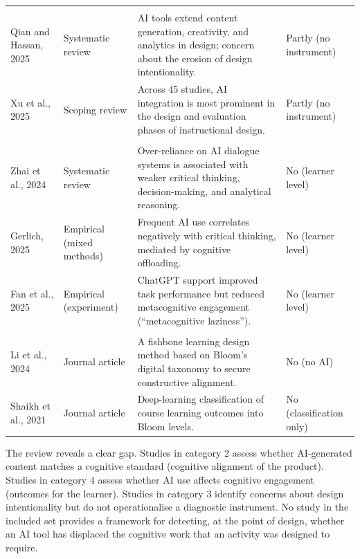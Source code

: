 \documentclass[journal,article,submit,pdftex,moreauthors]{Definitions/mdpi}
\begin{document}
\begin{table}[H]
\begin{tabularx}{\linewidth}{>{\raggedright\arraybackslash}p{2.5cm}>{\raggedright\arraybackslash}p{1.7cm}>{\raggedright\arraybackslash}X>{\raggedright\arraybackslash}p{1.7cm}}
\midrule
\multicolumn{4}{l}{\textit{AI in instructional design processes}} \\
Qian and Hassan, 2025 \cite{qian_hassan_2025} & Systematic review & AI tools extend content generation, creativity, and analytics in design; concern about the erosion of design intentionality. & Partly (no instrument) \\
Xu et al., 2025 \cite{xu_2025} & Scoping review & Across 45 studies, AI integration is most prominent in the design and evaluation phases of instructional design. & Partly (no instrument) \\
\midrule
\multicolumn{4}{l}{\textit{Cognitive offloading and AI}} \\
Zhai et al., 2024 \cite{zhai_2024} & Systematic review & Over-reliance on AI dialogue systems is associated with weaker critical thinking, decision-making, and analytical reasoning. & No (learner level) \\
Gerlich, 2025 \cite{gerlich_2025} & Empirical (mixed methods) & Frequent AI use correlates negatively with critical thinking, mediated by cognitive offloading. & No (learner level) \\
Fan et al., 2025 \cite{fan_2025} & Empirical (experiment) & ChatGPT support improved task performance but reduced metacognitive engagement (``metacognitive laziness''). & No (learner level) \\
\midrule
\multicolumn{4}{l}{\textit{Background}} \\
Li et al., 2024 \cite{li_fishbone_2024} & Journal article & A fishbone learning design method based on Bloom's digital taxonomy to secure constructive alignment. & No (no AI) \\
Shaikh et al., 2021 \cite{shaikh_2021} & Journal article & Deep-learning classification of course learning outcomes into Bloom levels. & No (classification only) \\
\bottomrule
\end{tabularx}
\end{table}

The review reveals a clear gap. Studies in category 2 assess whether AI-generated content matches a cognitive standard (cognitive alignment of the product). Studies in category 4 assess whether AI use affects cognitive engagement (outcomes for the learner). Studies in category 3 identify concerns about design intentionality but do not operationalise a diagnostic instrument. No study in the included set provides a framework for detecting, at the point of design, whether an AI tool has displaced the cognitive work that an activity was designed to require.
\end{document}
